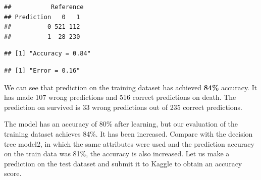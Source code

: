 \documentclass[
]{book}
\newenvironment{Shaded}{\begin{snugshade}}{\end{snugshade}}
\newcommand{\CommentTok}[1]{\textcolor[rgb]{0.56,0.35,0.01}{\textit{#1}}}
\newcommand{\DecValTok}[1]{\textcolor[rgb]{0.00,0.00,0.81}{#1}}
\newcommand{\KeywordTok}[1]{\textcolor[rgb]{0.13,0.29,0.53}{\textbf{#1}}}
\newcommand{\NormalTok}[1]{#1}
\newcommand{\OperatorTok}[1]{\textcolor[rgb]{0.81,0.36,0.00}{\textbf{#1}}}
\newcommand{\StringTok}[1]{\textcolor[rgb]{0.31,0.60,0.02}{#1}}
\begin{document}
\begin{verbatim}
##           Reference
## Prediction   0   1
##          0 521 112
##          1  28 230
\end{verbatim}

\begin{Shaded}
\end{Shaded}

\begin{verbatim}
## [1] "Accuracy = 0.84"
\end{verbatim}

\begin{Shaded}
\end{Shaded}

\begin{verbatim}
## [1] "Error = 0.16"
\end{verbatim}

We can see that prediction on the training dataset has achieved \textbf{84\%} accuracy.
It has made 107 wrong predictions and 516 correct predictions on death. The prediction on survived is 33 wrong predictions out of 235 correct predictions.

The model has an accuracy of 80\% after learning, but our evaluation of the training dataset achieves 84\%. It has been increased. Compare with the decision tree model2, in which the same attributes were used and the prediction accuracy on the train data was 81\%, the accuracy is also increased. Let us make a prediction on the test dataset and submit it to Kaggle to obtain an accuracy score.
\end{document}
